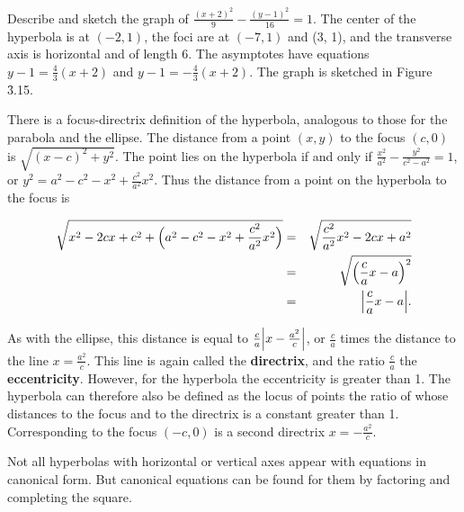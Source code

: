 \begin{example}
Describe and sketch the graph of $\frac{(x + 2)^2}{9} - \frac{(y - 1)^2}{16} = 1$. The center of the hyperbola is at $(-2, 1)$, the foci are at $(-7, 1)$ and (3, 1), and the transverse axis is horizontal and of length 6. The asymptotes have equations $y - 1 = \frac{4}{3}(x + 2)$ and $y - 1 = - \frac{4}{3} (x + 2)$. The graph is sketched in Figure \f{3.15}.

\noindent There is a focus-directrix definition of the hyperbola, analogous to those for the parabola and the ellipse. The distance from a point $(x, y)$ to the focus $(c, 0)$ is $\sqrt{(x - c)^2 + y^2}$. The point lies on the hyperbola if and only if $\frac{x^2}{a^2}  - \frac{y^2}{c^2 - a^2} = 1$, or $y^2 = a^2  - c^2 - x^2 + \frac{c^2}{a^2} x^2$. Thus the distance from a point on the hyperbola to the focus is

\begin{eqnarray*}
\sqrt{x^2 - 2cx + c^2 + \Bigl( a^2 - c^2 - x^2 + \frac{c^2}{ a^2}x^2 \Bigr)} 
&=& \sqrt{\frac{c^2}{a^2}x^2 - 2cx + a^2}\\
&=& \sqrt{\Bigl( \frac{c}{a}x - a \Bigr)^2}\\
&=& \Bigl| \frac{c}{a} x - a \Bigr|.
\end{eqnarray*}

\noindent As with the ellipse, this distance is equal to $\frac{c}{a} \Bigl|x - \frac{a^2}{c}\Bigr|$, or $\frac{c}{a}$ times the distance to the line $x = \frac{a^2}{c}$.  This line is again called the \textbf{directrix}, and the ratio $\frac{c}{a}$ the \textbf{eccentricity}. However, for the hyperbola the eccentricity is greater than 1. The hyperbola can therefore also be defined as the locus of points the ratio of whose distances to the focus and to the directrix is a constant greater than 1. Corresponding to the focus $(-c, 0)$ is a second directrix $x = - \frac{a^2}{c}$.

Not all hyperbolas with horizontal or vertical axes appear with equations in canonical form. But canonical equations can be found for them by factoring and completing the square.
\end{example}
\medskip

